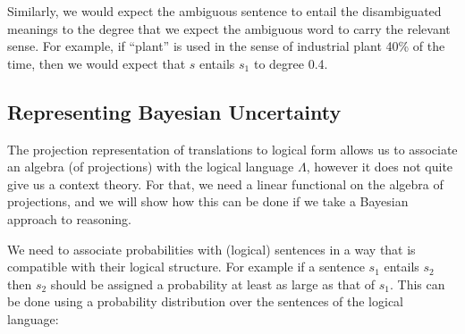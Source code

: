 Similarly, we would expect the ambiguous sentence to entail the disambiguated meanings to the degree that we expect the ambiguous word to carry the relevant sense. For example, if ``plant'' is used in the sense of industrial plant 40\% of the time, then we would expect that $s$ entails $s_1$ to degree 0.4.

\subsection{Representing Bayesian Uncertainty}
\label{bayesian-uncertainty-section}

The projection representation of translations to logical form allows us to associate an algebra (of projections) with the logical language $\Lambda$, however it does not quite give us a context theory. For that, we need a linear functional on the algebra of projections, and we will show how this can be done if we take a Bayesian approach to reasoning.

We need to associate probabilities with (logical) sentences in a way that is compatible with their logical structure. For example if a sentence $s_1$ entails $s_2$ then $s_2$ should be assigned a probability at least as large as that of $s_1$. This can be done using a probability distribution over the sentences of the logical language:



